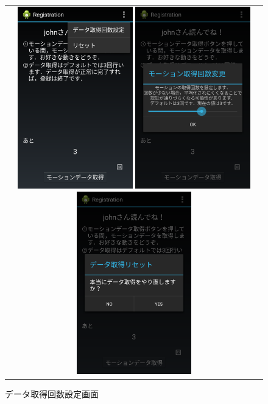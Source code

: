 \begin{figure}[hbtp]
  \centering
  \begin{tabular}{c}
    \begin{minipage}{0.33\hsize}
      \centering
      \includegraphics[bb=0 0 1080 1705, width=5cm]{Screenshots/reg-menu.pdf}
      \caption{メニュー画面}
      \label{reg-menu}
    \end{minipage}
    \begin{minipage}{0.33\hsize}
      \centering
      \includegraphics[bb=0 0 1080 1705, width=5cm]{Screenshots/reg-change-time.pdf}
      \caption{データ取得回数設定画面}
      \label{reg-change-time}
    \end{minipage}
    \begin{minipage}{0.33\hsize}
      \centering
      \includegraphics[bb=0 0 1080 1705, width=5cm]{Screenshots/reg-reset.pdf}

\end{minipage}
\end{tabular}
\end{figure}
